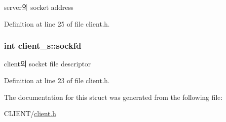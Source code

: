 server의 socket address 



Definition at line 25 of file client.\-h.

\hypertarget{structclient__s_a409a70b3071eaf5be18d0439d256756a}{
\subsubsection[{sockfd}]{\setlength{\rightskip}{0pt plus 5cm}int client\-\_\-s\-::sockfd}}\label{structclient__s_a409a70b3071eaf5be18d0439d256756a}


client의 socket file descriptor 



Definition at line 23 of file client.\-h.



The documentation for this struct was generated from the following file\-:\begin{DoxyCompactItemize}
\item 
C\-L\-I\-E\-N\-T/\hyperlink{client_8h}{client.\-h}\end{DoxyCompactItemize}
